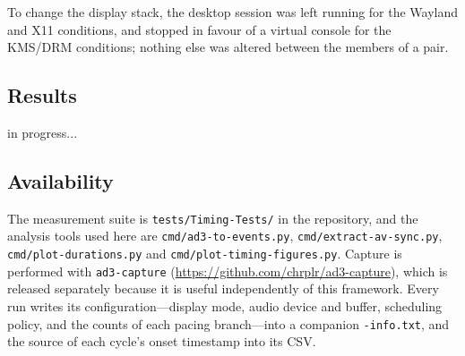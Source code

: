 \documentclass[doc,a4paper,floatsintext]{apa7}
\begin{document}
To change the display stack, the desktop session was left running for the
Wayland and X11 conditions, and stopped in favour of a virtual console for the
KMS/DRM conditions; nothing else was altered between the members of a pair.

\subsection{Results}

in progress...

\subsection{Availability}

The measurement suite is \texttt{tests/Timing-Tests/} in the repository, and the
analysis tools used here are \texttt{cmd/ad3-to-events.py},
\texttt{cmd/extract-av-sync.py}, \texttt{cmd/plot-durations.py} and
\texttt{cmd/plot-timing-figures.py}. Capture is performed with
\texttt{ad3-capture} (\url{https://github.com/chrplr/ad3-capture}), which is
released separately because it is useful independently of this framework. Every
run writes its configuration---display mode, audio device and buffer, scheduling
policy, and the counts of each pacing branch---into a companion
\texttt{-info.txt}, and the source of each cycle's onset timestamp into its CSV.
\end{document}
